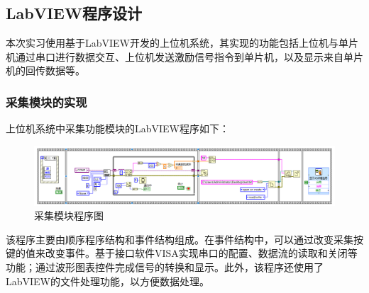 \documentclass[UTF8]{article}
\begin{document}
\subsection{LabVIEW程序设计}
本次实习使用基于LabVIEW开发的上位机系统，其实现的功能包括上位机与单片机通过串口进行数据交互、上位机发送激励信号指令到单片机，以及显示来自单片机的回传数据等。
\subsubsection{采集模块的实现}
上位机系统中采集功能模块的LabVIEW程序如下：
\begin{figure}[H]
    \centering %
    \includegraphics[width=1\textwidth]{figure/采集模块-程序.png} 
    \caption{采集模块程序图} %
\end{figure}
该程序主要由顺序程序结构和事件结构组成。在事件结构中，可以通过改变采集按键的值来改变事件。基于接口软件VISA实现串口的配置、数据流的读取和关闭等功能；通过波形图表控件完成信号的转换和显示。此外，该程序还使用了LabVIEW的文件处理功能，以方便数据处理。

\end{document}
